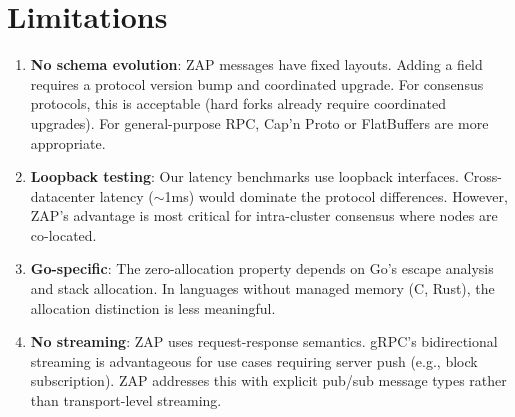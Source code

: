 \section{Limitations}


\begin{enumerate}
\item \textbf{No schema evolution}: ZAP messages have fixed layouts. Adding a field requires a protocol version bump and coordinated upgrade. For consensus protocols, this is acceptable (hard forks already require coordinated upgrades). For general-purpose RPC, Cap'n Proto or FlatBuffers are more appropriate.

\item \textbf{Loopback testing}: Our latency benchmarks use loopback interfaces. Cross-datacenter latency ($\sim$1ms) would dominate the protocol differences. However, ZAP's advantage is most critical for intra-cluster consensus where nodes are co-located.

\item \textbf{Go-specific}: The zero-allocation property depends on Go's escape analysis and stack allocation. In languages without managed memory (C, Rust), the allocation distinction is less meaningful.

\item \textbf{No streaming}: ZAP uses request-response semantics. gRPC's bidirectional streaming is advantageous for use cases requiring server push (e.g., block subscription). ZAP addresses this with explicit pub/sub message types rather than transport-level streaming.
\end{enumerate}

